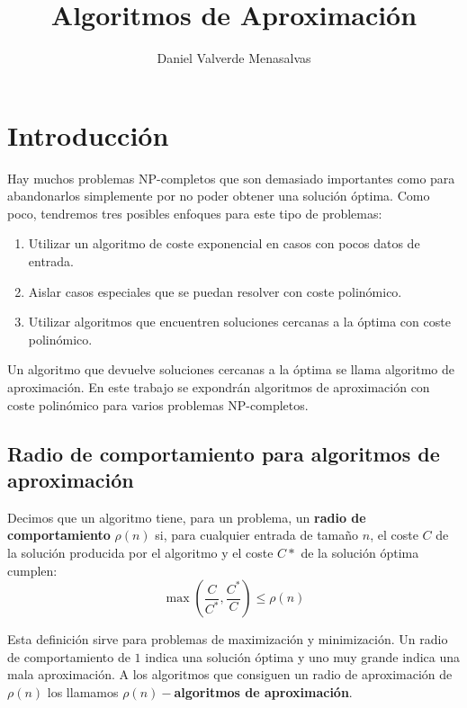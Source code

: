 \documentclass{article}
\begin{document}
\sloppy
\title{Algoritmos de Aproximaci\'on}

\author{Daniel Valverde Menasalvas}

\maketitle

\newtheorem{thr}{Teorema}[section]
\section{Introducción}
\label{sec:introduction}
Hay muchos problemas NP-completos que son demasiado importantes como para abandonarlos simplemente por no poder obtener una soluci\'on \'optima. Como poco, tendremos tres posibles enfoques para este tipo de problemas: 
\begin{enumerate}
	\item Utilizar un algoritmo de coste exponencial en casos con pocos datos de entrada.
	\item Aislar casos especiales que se puedan resolver con coste polin\'omico.
	\item Utilizar algoritmos que encuentren soluciones cercanas a la \'optima con coste polin\'omico.
\end{enumerate}

Un algoritmo que devuelve soluciones cercanas a la \'optima se llama algoritmo de aproximaci\'on. En este trabajo se expondrán algoritmos de aproximaci\'on con coste polin\'omico para varios problemas NP-completos.\\

\subsection{Radio de comportamiento para algoritmos de aproximaci\'on}
Decimos que un algoritmo tiene, para un problema, un \textbf{radio de comportamiento} $\rho(n)$ si, para cualquier entrada de tamaño $n$, el coste $C$ de la soluci\'on producida por el algoritmo y el coste $C*$
 de la soluci\'on \'optima cumplen: 
\[
	\max(\frac{C}{C^{*}}, \frac{C^{*}}{C}) \leq \rho(n)
\]


Esta definici\'on sirve para problemas de maximizaci\'on y minimizaci\'on. Un radio de comportamiento de $1$ indica una soluci\'on \'optima y uno muy grande indica una mala aproximaci\'on. A los algoritmos que consiguen un radio de aproximaci\'on de $\rho(n)$ los llamamos \textbf{$\rho(n)-$algoritmos de aproximaci\'on}.\\
\end{document}

